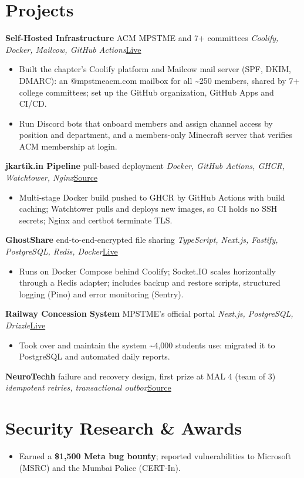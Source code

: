 \documentclass[10pt, a4paper]{article}
\newcommand{\proj}[4]{\par\vspace{2.5pt}\textbf{#1} \textbar{} #2 \textbar{} \textit{\small #3}\hfill{\small #4}\par}
\newcommand{\lnk}[2]{\href{#1}{\color{linkc}#2}}
\begin{document}
\section{Projects}
\proj{Self-Hosted Infrastructure}{ACM MPSTME and 7+ committees}{Coolify, Docker, Mailcow, GitHub Actions}{\lnk{https://mpstmeacm.com}{Live}}
\begin{itemize}
  \item Built the chapter's Coolify platform and Mailcow mail server (SPF, DKIM, DMARC): an @mpstmeacm.com mailbox for all
  \textasciitilde{}250 members, shared by 7+ college committees; set up the GitHub organization, GitHub Apps and CI/CD.
  \item Run Discord bots that onboard members and assign channel access by position and department, and a members-only
  Minecraft server that verifies ACM membership at login.
\end{itemize}
\proj{jkartik.in Pipeline}{pull-based deployment}{Docker, GitHub Actions, GHCR, Watchtower, Nginx}{\lnk{https://github.com/KartikJain14/jkartik.in}{Source}}
\begin{itemize}
  \item Multi-stage Docker build pushed to GHCR by GitHub Actions with build caching; Watchtower pulls and deploys new images, so CI
  holds no SSH secrets; Nginx and certbot terminate TLS.
\end{itemize}
\proj{GhostShare}{end-to-end-encrypted file sharing}{TypeScript, Next.js, Fastify, PostgreSQL, Redis, Docker}{\lnk{https://share.jkartik.in}{Live}}
\begin{itemize}
  \item Runs on Docker Compose behind Coolify; Socket.IO scales horizontally through a Redis adapter; includes backup and restore
  scripts, structured logging (Pino) and error monitoring (Sentry).
\end{itemize}
\proj{Railway Concession System}{MPSTME's official portal}{Next.js, PostgreSQL, Drizzle}{\lnk{https://concession.mpst.me}{Live}}
\begin{itemize}
  \item Took over and maintain the system \textasciitilde{}4,000 students use: migrated it to PostgreSQL and automated daily reports.
\end{itemize}
\proj{NeuroTechh}{failure and recovery design, first prize at MAL 4 (team of 3)}{idempotent retries, transactional outbox}{\lnk{https://github.com/KartikJain14/mal-hackathon}{Source}}

\section{Security Research \& Awards}
\begin{itemize}
  \item Earned a \textbf{\$1,500 Meta bug bounty}; reported vulnerabilities to Microsoft (MSRC) and the Mumbai Police (CERT-In).
\end{itemize}
\end{document}
